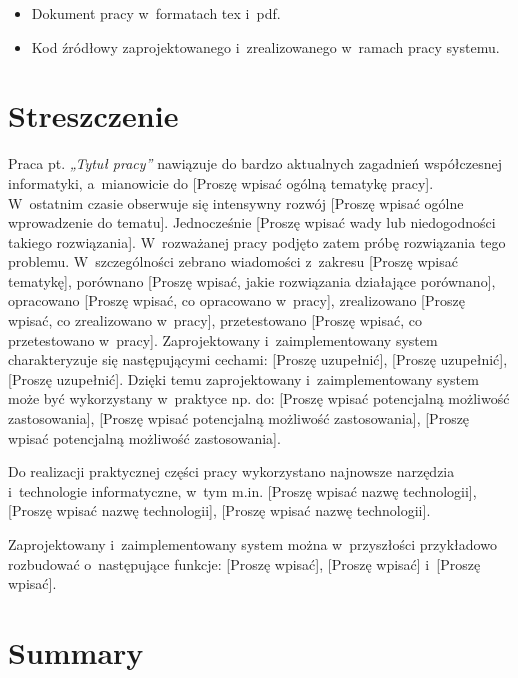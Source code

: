 \documentclass{PracaDyplomowa-Szablon}
\begin{document}
\begin{itemize}
\item Dokument pracy w~formatach tex i~pdf.

\item Kod źródłowy zaprojektowanego i~zrealizowanego w~ramach pracy systemu.
\end{itemize}

\listoffigures
{}

\listoftables
{}

\lstlistoflistings
{}

\chapter*{Streszczenie}

Praca pt. \textit{„Tytuł pracy”} nawiązuje do bardzo aktualnych zagadnień współczesnej informatyki, a~mianowicie do [Proszę wpisać ogólną tematykę pracy]. W~ostatnim czasie obserwuje się intensywny rozwój [Proszę wpisać ogólne wprowadzenie do tematu]. Jednocześnie [Proszę wpisać wady lub niedogodności takiego rozwiązania]. W~rozważanej pracy podjęto zatem próbę rozwiązania tego problemu. W~szczególności zebrano wiadomości z~zakresu [Proszę wpisać tematykę], porównano [Proszę wpisać, jakie rozwiązania działające porównano], opracowano [Proszę wpisać, co opracowano w~pracy], zrealizowano [Proszę wpisać, co zrealizowano w~pracy], przetestowano [Proszę wpisać, co przetestowano w~pracy]. Zaprojektowany i~zaimplementowany system charakteryzuje się następującymi cechami: [Proszę uzupełnić], [Proszę uzupełnić], [Proszę uzupełnić]. Dzięki temu zaprojektowany i~zaimplementowany system może być wykorzystany w~praktyce np. do: [Proszę wpisać potencjalną możliwość zastosowania], [Proszę wpisać potencjalną możliwość zastosowania], [Proszę wpisać potencjalną możliwość zastosowania].

Do realizacji praktycznej części pracy wykorzystano najnowsze narzędzia i~technologie informatyczne, w~tym m.in. [Proszę wpisać nazwę technologii], [Proszę wpisać nazwę technologii], [Proszę wpisać nazwę technologii].

Zaprojektowany i~zaimplementowany system można w~przyszłości przykładowo rozbudować o~następujące funkcje: [Proszę wpisać], [Proszę wpisać] i~[Proszę wpisać].

\chapter*{Summary}
\end{document}
